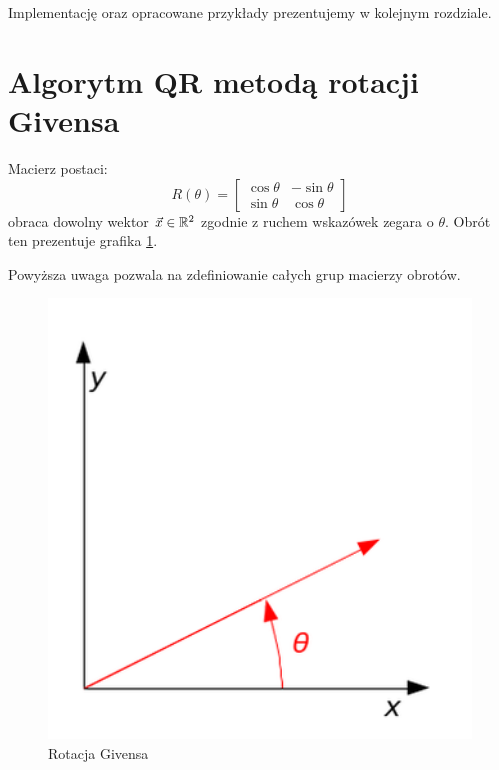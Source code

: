 \documentclass[12pt,a4paper]{report}
\begin{document}
Implementację oraz opracowane przykłady prezentujemy w kolejnym rozdziale.
 
\section{Algorytm QR metodą rotacji Givensa}
\begin{remark}
Macierz postaci: 
$$
R(\theta) = \begin{bmatrix}
\cos\theta & -\sin\theta \\
\sin\theta & \cos\theta
\end{bmatrix}
$$
obraca dowolny wektor $\vec{x}\in \mathbb{R}^{2}$ zgodnie z ruchem wskazówek zegara o $\theta$. Obrót ten prezentuje grafika \ref{rys:logo:jeden}.
\end{remark}

Powyższa uwaga pozwala na zdefiniowanie całych grup macierzy obrotów.
\begin{figure}
\centering
\includegraphics[width=12cm] {rys/givens_rot.png} 
\caption{Rotacja Givensa \citep{ilustracja}}\label{rys:logo:jeden}
\end{figure}
\end{document}
